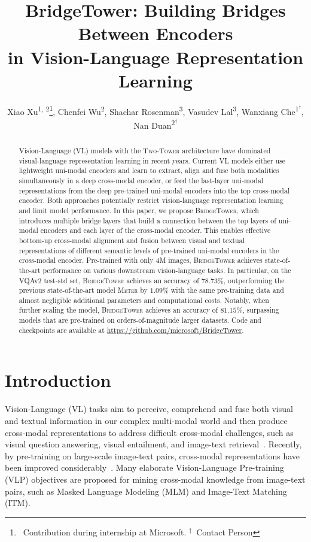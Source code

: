 \documentclass[letterpaper]{article} %
\title{
    {BridgeTower}: Building Bridges Between Encoders \\ in Vision-Language Representation Learning
}
\author {
    Xiao Xu\textsuperscript{\rm 1, 2}\thanks{\ Contribution during internship at Microsoft. $^\dagger$\ Contact Person},
    Chenfei Wu\textsuperscript{\rm 2},
    Shachar Rosenman\textsuperscript{\rm 3},
    Vasudev Lal\textsuperscript{\rm 3},
    Wanxiang Che\textsuperscript{\rm 1$^\dagger$},
    Nan Duan\textsuperscript{\rm 2$^\dagger$}
}
\newcommand{\methodname}[0]{\textsc{BridgeTower}}
\newcommand{\metername}[0]{\textsc{Meter}}
\newcommand{\twotower}[0]{\textsc{Two-Tower}}
\begin{document}
\maketitle

\begin{abstract}
    Vision-Language (VL) models with the \twotower{} architecture have dominated visual-language representation learning in recent years.
    Current VL models either use lightweight uni-modal encoders and learn to extract, align and fuse both modalities simultaneously in a deep cross-modal encoder, or feed the last-layer uni-modal representations from the deep pre-trained uni-modal encoders into the top cross-modal encoder. 
    Both approaches potentially restrict vision-language representation learning and limit model performance.
    In this paper, we propose \methodname{}, which introduces multiple bridge layers that build a connection between the top layers of uni-modal encoders and each layer of the cross-modal encoder. 
    This enables effective bottom-up cross-modal alignment and fusion between visual and textual representations of different semantic levels of pre-trained uni-modal encoders in the cross-modal encoder.
    Pre-trained with only $4$M images, \methodname{} achieves state-of-the-art performance on various downstream vision-language tasks. 
    In particular, on the VQAv2 test-std set, \methodname{} achieves an accuracy of $78.73\%$, outperforming the previous state-of-the-art model \metername{} by $1.09\%$ with the same pre-training data and almost negligible additional parameters and computational costs. 
    Notably, when further scaling the model, \methodname{} achieves an accuracy of $81.15\%$, surpassing models that are pre-trained on orders-of-magnitude larger datasets.
    Code and checkpoints are available at \url{https://github.com/microsoft/BridgeTower}.
\end{abstract}

\section{Introduction}

Vision-Language (VL) tasks aim to perceive, comprehend and fuse both visual and textual information in our complex multi-modal world and then produce cross-modal representations to address difficult cross-modal challenges, such as visual question answering, visual entailment, and image-text retrieval~\citep{balanced_vqa_v2,xie2019visual,young-etal-2014-image}.
Recently, by pre-training on large-scale image-text pairs, cross-modal representations have been improved considerably~\citep{su2019vl,lu2019vilbert,chen2020uniter,zhang2021vinvl,radford2021learning,wang2021simvlm,li2021align,dou2021meter,wang2022OFA,alayrac2022flamingo}. 
Many elaborate Vision-Language Pre-training (VLP) objectives are proposed for mining cross-modal knowledge from image-text pairs, such as Masked Language Modeling (MLM) and Image-Text Matching (ITM).
\end{document}
